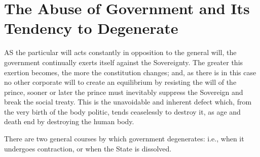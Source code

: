 \documentclass[12pt]{report}
\begin{document}
\section{The Abuse of Government and Its Tendency to Degenerate}
AS the particular will acts constantly in opposition to the general will, the government continually exerts itself against the Sovereignty. The greater this exertion becomes, the more the constitution changes; and, as there is in this case no other corporate will to create an equilibrium by resisting the will of the prince, sooner or later the prince must inevitably suppress the Sovereign and break the social treaty. This is the unavoidable and inherent defect which, from the very birth of the body politic, tends ceaselessly to destroy it, as age and death end by destroying the human body.

There are two general courses by which government degenerates: i.e., when it undergoes contraction, or when the State is dissolved.
\end{document}
